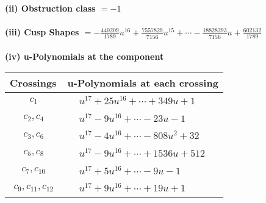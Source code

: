 \documentclass[1p]{elsarticle_modified}
\theoremstyle{definition}
\begin{document}
\flushleft \textbf{(ii) Obstruction class $= -1$}\\~\\
\flushleft \textbf{(iii) Cusp Shapes $= -\frac{440209}{1789} u^{16}+\frac{7557829}{7156} u^{15}+\cdots-\frac{18828293}{7156} u+\frac{602132}{1789}$}\\~\\
\newpage\renewcommand{\arraystretch}{1}
\flushleft \textbf{(iv) u-Polynomials at the component}\newline \\
\begin{tabular}{m{50pt}|m{274pt}}
Crossings & \hspace{64pt}u-Polynomials at each crossing \\
\hline $$\begin{aligned}c_{1}\end{aligned}$$&$\begin{aligned}
&u^{17}+25 u^{16}+\cdots+349 u+1
\end{aligned}$\\
\hline $$\begin{aligned}c_{2},c_{4}\end{aligned}$$&$\begin{aligned}
&u^{17}-9 u^{16}+\cdots-23 u-1
\end{aligned}$\\
\hline $$\begin{aligned}c_{3},c_{6}\end{aligned}$$&$\begin{aligned}
&u^{17}-4 u^{16}+\cdots-808 u^2+32
\end{aligned}$\\
\hline $$\begin{aligned}c_{5},c_{8}\end{aligned}$$&$\begin{aligned}
&u^{17}-9 u^{16}+\cdots+1536 u+512
\end{aligned}$\\
\hline $$\begin{aligned}c_{7},c_{10}\end{aligned}$$&$\begin{aligned}
&u^{17}+5 u^{16}+\cdots-9 u-1
\end{aligned}$\\
\hline $$\begin{aligned}c_{9},c_{11},c_{12}\end{aligned}$$&$\begin{aligned}
&u^{17}+9 u^{16}+\cdots+19 u+1
\end{aligned}$\\
\hline
\end{tabular}\\~\\
\end{document}
